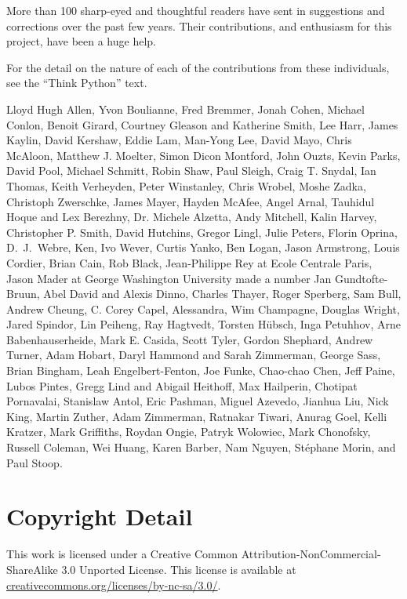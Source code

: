 \documentclass[11pt]{book}
\begin{document}
More than 100 sharp-eyed and thoughtful readers have sent in
suggestions and corrections over the past few years.  Their
contributions, and enthusiasm for this project, have been a
huge help.

For the detail on the nature of each of the contributions from
these individuals, see the ``Think Python'' text.

Lloyd Hugh Allen,
Yvon Boulianne,
Fred Bremmer,
Jonah Cohen,
Michael Conlon,
Benoit Girard,
Courtney Gleason and Katherine Smith,
Lee Harr,
James Kaylin,
David Kershaw,
Eddie Lam,
Man-Yong Lee,
David Mayo,
Chris McAloon,
Matthew J. Moelter,
Simon Dicon Montford,
John Ouzts,
Kevin Parks,
David Pool,
Michael Schmitt,
Robin Shaw,
Paul Sleigh,
Craig T. Snydal,
Ian Thomas,
Keith Verheyden,
Peter Winstanley,
Chris Wrobel,
Moshe Zadka,
Christoph Zwerschke,
James Mayer,
Hayden McAfee,
Angel Arnal,
Tauhidul Hoque and Lex Berezhny,
Dr. Michele Alzetta,
Andy Mitchell,
Kalin Harvey,
Christopher P. Smith,
David Hutchins,
Gregor Lingl,
Julie Peters,
Florin Oprina,
D.~J.~Webre,
Ken,
Ivo Wever,
Curtis Yanko,
Ben Logan,
Jason Armstrong,
Louis Cordier,
Brian Cain,
Rob Black,
Jean-Philippe Rey at Ecole Centrale Paris,
Jason Mader at George Washington University made a number
Jan Gundtofte-Bruun,
Abel David and Alexis Dinno,
Charles Thayer,
Roger Sperberg,
Sam Bull,
Andrew Cheung,
C. Corey Capel,
Alessandra,
Wim Champagne,
Douglas Wright,
Jared Spindor,
Lin Peiheng,
Ray Hagtvedt,
Torsten H\"{u}bsch,
Inga Petuhhov,
Arne Babenhauserheide,
Mark E. Casida,
Scott Tyler,
Gordon Shephard,
Andrew Turner,
Adam Hobart,
Daryl Hammond and Sarah Zimmerman,
George Sass,
Brian Bingham,
Leah Engelbert-Fenton,
Joe Funke,
Chao-chao Chen,
Jeff Paine,
Lubos Pintes,
Gregg Lind and Abigail Heithoff,
Max Hailperin,
Chotipat Pornavalai,
Stanislaw Antol,
Eric Pashman,
Miguel Azevedo,
Jianhua Liu,
Nick King,
Martin Zuther,
Adam Zimmerman,
Ratnakar Tiwari,
Anurag Goel,
Kelli Kratzer,
Mark Griffiths,
Roydan Ongie,
Patryk Wolowiec,
Mark Chonofsky,
Russell Coleman,
Wei Huang,
Karen Barber,
Nam Nguyen,
St\'{e}phane Morin,
and
Paul Stoop.

\chapter{Copyright Detail}

This work is licensed under a 
Creative Common
Attribution-NonCommercial-ShareAlike 3.0 Unported License.
This license is 
available at
\url{creativecommons.org/licenses/by-nc-sa/3.0/}.  
\end{document}
